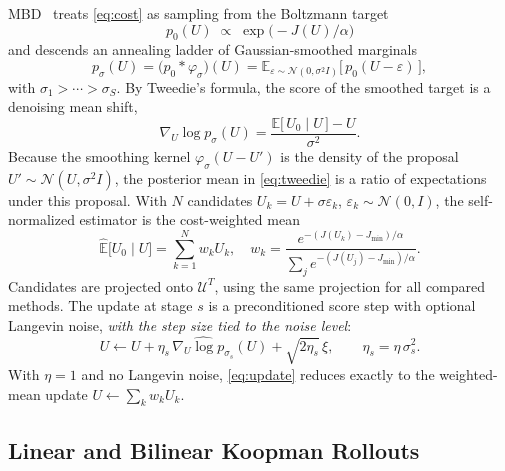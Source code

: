 \documentclass[letterpaper,10pt,conference]{ieeeconf}
\begin{document}
MBD~\cite{pan2024model} treats \eqref{eq:cost} as sampling from the Boltzmann target
\begin{equation}
p_0(U) \;\propto\; \exp\!\big(-J(U)/\alpha\big)
\label{eq:target}
\end{equation}
and descends an annealing ladder of Gaussian-smoothed marginals
\begin{equation}
p_{\sigma}(U) = \big(p_0 * \varphi_{\sigma}\big)(U)
= \mathbb{E}_{\varepsilon \sim \mathcal{N}(0, \sigma^{2} I)}
\big[\, p_0(U - \varepsilon) \,\big],
\label{eq:smooth}
\end{equation}
with $\sigma_1 > \cdots > \sigma_S$.
By Tweedie's formula, the score of the smoothed target is a denoising mean shift,
\begin{equation}
\nabla_U \log p_{\sigma}(U)
= \frac{\mathbb{E}\big[\,U_0 \mid U\,\big] - U}{\sigma^{2}} .
\label{eq:tweedie}
\end{equation}
Because the smoothing kernel $\varphi_\sigma(U-U')$ is the density of the proposal $U' \sim \mathcal{N}(U,\sigma^2 I)$, the posterior mean in \eqref{eq:tweedie} is a ratio of expectations under this proposal. With $N$ candidates $U_k=U+\sigma\varepsilon_k$, $\varepsilon_k\sim\mathcal{N}(0,I)$, the self-normalized estimator is the cost-weighted mean
\begin{equation}
\widehat{\mathbb{E}}\big[U_0 \mid U\big] = \sum_{k=1}^{N} w_k U_k,
\quad
w_k = \frac{e^{-(J(U_k) - J_{\min})/\alpha}}
           {\sum_{j} e^{-(J(U_j) - J_{\min})/\alpha}} .
\label{eq:weights}
\end{equation}
Candidates are projected onto $\mathcal{U}^{T}$, using the same projection for all compared methods.
The update at stage $s$ is a preconditioned score step with optional Langevin noise, \emph{with the step size tied to the noise level}:
\begin{equation}
U \leftarrow U + \eta_s\, \widehat{\nabla_U \log p_{\sigma_s}}(U)
+ \sqrt{2 \eta_s}\, \xi,
\qquad
\eta_s = \eta\, \sigma_s^{2} .
\label{eq:update}
\end{equation}
With $\eta = 1$ and no Langevin noise, \eqref{eq:update} reduces exactly to the weighted-mean update $U \leftarrow \sum_k w_k U_k$.

\subsection{Linear and Bilinear Koopman Rollouts}\label{subsec:koopman}
\end{document}
